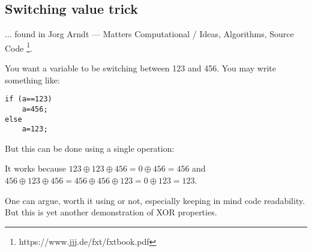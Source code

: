 \subsection{Switching value trick}

... found in Jorg Arndt --- Matters Computational / Ideas, Algorithms, Source Code
\footnote{https://www.jjj.de/fxt/fxtbook.pdf}.

You want a variable to be switching between 123 and 456.
You may write something like:

\begin{lstlisting}
if (a==123)
    a=456;
else
    a=123;
\end{lstlisting}

But this can be done using a single operation:



It works because $123 \oplus 123 \oplus 456=0 \oplus 456=456$ and
$456 \oplus 123 \oplus 456=456 \oplus 456 \oplus 123=0 \oplus 123=123$.

One can argue, worth it using or not, especially keeping in mind code readability.
But this is yet another demonstration of XOR properties.

